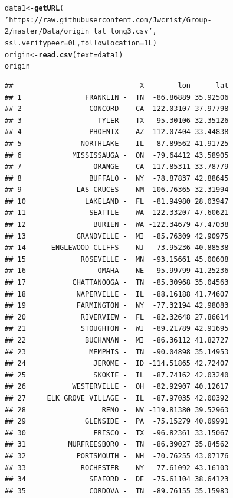\documentclass{article}\usepackage[]{graphicx}\usepackage[]{color}
\makeatletter
\newcommand{\hlnum}[1]{\textcolor[rgb]{0.686,0.059,0.569}{#1}}%
\newcommand{\hlstr}[1]{\textcolor[rgb]{0.192,0.494,0.8}{#1}}%
\newcommand{\hlstd}[1]{\textcolor[rgb]{0.345,0.345,0.345}{#1}}%
\newcommand{\hlkwb}[1]{\textcolor[rgb]{0.69,0.353,0.396}{#1}}%
\newcommand{\hlkwc}[1]{\textcolor[rgb]{0.333,0.667,0.333}{#1}}%
\newcommand{\hlkwd}[1]{\textcolor[rgb]{0.737,0.353,0.396}{\textbf{#1}}}%
\newenvironment{kframe}{%
 \def\at@end@of@kframe{}%
 \ifinner\ifhmode%
  \def\at@end@of@kframe{\end{minipage}}%
  \begin{minipage}{\columnwidth}%
 \fi\fi%
 \def\FrameCommand##1{\hskip\@totalleftmargin \hskip-\fboxsep
 \colorbox{shadecolor}{##1}\hskip-\fboxsep
     \hskip-\linewidth \hskip-\@totalleftmargin \hskip\columnwidth}%
 \MakeFramed {\advance\hsize-\width
   \@totalleftmargin\z@ \linewidth\hsize
   \@setminipage}}%
 {\par\unskip\endMakeFramed%
 \at@end@of@kframe}
\newenvironment{knitrout}{}{} %
\makeatother
\begin{document}
\begin{knitrout}
\color{fgcolor}\begin{kframe}
\begin{alltt}
\hlstd{data1} \hlkwb{<-} \hlkwd{getURL}\hlstd{(}
  \hlstr{'https://raw.githubusercontent.com/Jwcrist/Group-2/master/Data/origin_lat_long3.csv'}\hlstd{,}
  \hlkwc{ssl.verifypeer}\hlstd{=}\hlnum{0L}\hlstd{,} \hlkwc{followlocation}\hlstd{=}\hlnum{1L}\hlstd{)}
\hlstd{origin} \hlkwb{<-} \hlkwd{read.csv}\hlstd{(}\hlkwc{text}\hlstd{=data1)}
\hlstd{origin}
\end{alltt}
\begin{verbatim}
##                              X        lon      lat
## 1               FRANKLIN -  TN  -86.86889 35.92506
## 2                CONCORD -  CA -122.03107 37.97798
## 3                  TYLER -  TX  -95.30106 32.35126
## 4                PHOENIX -  AZ -112.07404 33.44838
## 5              NORTHLAKE -  IL  -87.89562 41.91725
## 6            MISSISSAUGA -  ON  -79.64412 43.58905
## 7                 ORANGE -  CA -117.85311 33.78779
## 8                BUFFALO -  NY  -78.87837 42.88645
## 9             LAS CRUCES -  NM -106.76365 32.31994
## 10              LAKELAND -  FL  -81.94980 28.03947
## 11               SEATTLE -  WA -122.33207 47.60621
## 12                BURIEN -  WA -122.34679 47.47038
## 13            GRANDVILLE -  MI  -85.76309 42.90975
## 14      ENGLEWOOD CLIFFS -  NJ  -73.95236 40.88538
## 15             ROSEVILLE -  MN  -93.15661 45.00608
## 16                 OMAHA -  NE  -95.99799 41.25236
## 17           CHATTANOOGA -  TN  -85.30968 35.04563
## 18            NAPERVILLE -  IL  -88.16188 41.74607
## 19            FARMINGTON -  NY  -77.32194 42.98083
## 20             RIVERVIEW -  FL  -82.32648 27.86614
## 21             STOUGHTON -  WI  -89.21789 42.91695
## 22              BUCHANAN -  MI  -86.36112 41.82727
## 23               MEMPHIS -  TN  -90.04898 35.14953
## 24                JEROME -  ID -114.51865 42.72407
## 25                SKOKIE -  IL  -87.74162 42.03240
## 26           WESTERVILLE -  OH  -82.92907 40.12617
## 27     ELK GROVE VILLAGE -  IL  -87.97035 42.00392
## 28                  RENO -  NV -119.81380 39.52963
## 29              GLENSIDE -  PA  -75.15279 40.09991
## 30                FRISCO -  TX  -96.82361 33.15067
## 31          MURFREESBORO -  TN  -86.39027 35.84562
## 32            PORTSMOUTH -  NH  -70.76255 43.07176
## 33             ROCHESTER -  NY  -77.61092 43.16103
## 34               SEAFORD -  DE  -75.61104 38.64123
## 35               CORDOVA -  TN  -89.76155 35.15983

\end{verbatim}
\end{kframe}
\end{knitrout}
\end{document}
